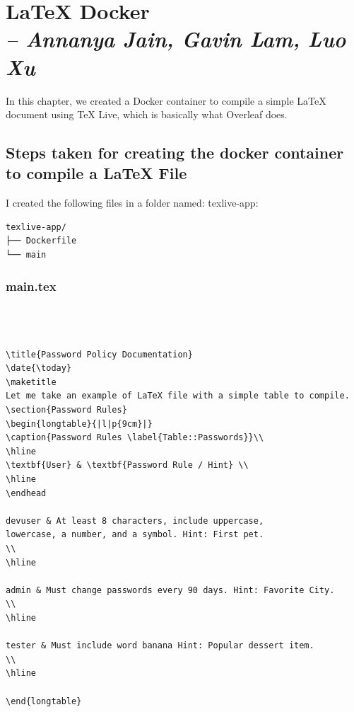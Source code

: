 \chapter{LaTeX Docker \\
\small{\textit{-- Annanya Jain, Gavin Lam, Luo Xu}
\label{Chapter::LaTeX Docker}}}


In this chapter, we created a Docker container to compile a simple LaTeX document using TeX Live, which is basically what Overleaf does. \medskip

\section{Steps taken for creating the docker container to compile a LaTeX File}

I created the following files in a folder named: texlive-app:

\begin{verbatim}
texlive-app/
├── Dockerfile
└── main
\end{verbatim}

\subsection{main.tex}

\begin{verbatim}



\title{Password Policy Documentation}
\date{\today}
\maketitle
Let me take an example of LaTeX file with a simple table to compile. 
\section{Password Rules}
\begin{longtable}{|l|p{9cm}|} 
\caption{Password Rules \label{Table::Passwords}}\\
\hline
\textbf{User} & \textbf{Password Rule / Hint} \\
\hline
\endhead

devuser & At least 8 characters, include uppercase, 
lowercase, a number, and a symbol. Hint: First pet. 
\\ 
\hline

admin & Must change passwords every 90 days. Hint: Favorite City. 
\\ 
\hline

tester & Must include word banana Hint: Popular dessert item. 
\\ 
\hline

\end{longtable}


\end{verbatim}

